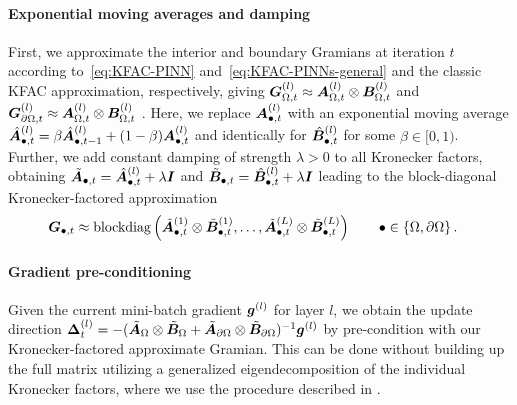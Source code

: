 \paragraph{Exponential moving averages and damping} %
First, we approximate the interior and boundary Gramians at iteration $t$  according to~\eqref{eq:KFAC-PINN} and~\eqref{eq:KFAC-PINNs-general} and the classic KFAC approximation, respectively, giving
${\bm{G}}_{\Omega,t}^{(l)} \approx {\bm{A}}_{\Omega,t}^{(l)}\otimes {\bm{B}}_{\Omega,t}^{(l)}$ and ${\bm{G}}_{\partial \Omega, t}^{(l)}\approx {\bm{A}}_{\Omega,t}^{(l)}\otimes {\bm{B}}_{\Omega,t}^{(l)}$ .
Here, we replace ${\bm{A}}^{(l)}_{\bullet,t}$ with an exponential moving average $\hat{{\bm{A}}}^{(l)}_{\bullet,t} = \beta \hat{{\bm{A}}}^{(l)}_{\bullet,t-1} + (1 - \beta) {\bm{A}}^{(l)}_{\bullet,t}$
and identically for $\hat{{\bm{B}}}^{(l)}_{\bullet, t}$ for some $\beta\in[0,1)$.
Further, we add constant damping of strength $\lambda>0$ to all Kronecker factors, obtaining $\tilde{{\bm{A}}}_{\bullet,t} = \hat{{\bm{A}}}^{(l)}_{\bullet,t} + \lambda {\bm{I}}$ and $\tilde{{\bm{B}}}_{\bullet,t} = \hat{{\bm{B}}}^{(l)}_{\bullet,t} + \lambda {\bm{I}}$
leading to the
 block-diagonal Kronecker-factored approximation
\begin{align*}
  {\bm{G}}_{\bullet, t}
  &\approx
    \operatorname{blockdiag}
    \left(
    \tilde{{\bm{A}}}^{(1)}_{\bullet,t} \otimes \tilde{{\bm{B}}}_{\bullet,t}^{(1)},
    \dots,
    \tilde{{\bm{A}}}^{(L)}_{\bullet,t} \otimes \tilde{{\bm{B}}}_{\bullet,t}^{(L)}
    \right)
    \qquad \bullet \in \{ \Omega, \partial\Omega\}\,.
\end{align*}

\paragraph{Gradient pre-conditioning%
}
Given the current mini-batch gradient ${\bm{g}}^{(l)}$ for layer $l$, we obtain the update direction ${\bm{\Delta}}_t^{(l)} = -(\tilde{{\bm{A}}}_{\Omega} \otimes \tilde{{\bm{B}}}_{\Omega} + \tilde{{\bm{A}}}_{\partial\Omega} \otimes \tilde{{\bm{B}}}_{\partial\Omega})^{-1} {\bm{g}}^{(l)}$ by
pre-condition with our Kronecker-factored approximate Gramian.
This can be done without building up the full matrix utilizing a generalized eigendecomposition of the individual Kronecker factors, where we use the procedure described in \cite[Appendix I]{martens2015optimizing}.


